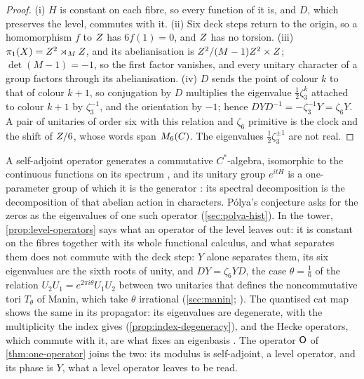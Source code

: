 \begin{proof}
(i) $H$ is constant on each fibre, so every function of it is, and $D$, which preserves the level, commutes with it.
(ii) Six deck steps return to the origin, so a homomorphism $f$ to $Z$ has $6f(1)=0$, and $Z$ has no torsion.
(iii) $\pi_1(X)=Z^2\rtimes_MZ$, and its abelianisation is $Z^2/(M-1)Z^2\times Z$; $\det(M-1)=-1$, so the first
factor vanishes, and every unitary character of a group factors through its abelianisation.
(iv) $D$ sends the point of colour $k$ to that of colour $k+1$, so conjugation by $D$ multiplies the eigenvalue
$\tfrac12\zeta_3^{k}$ attached to colour $k+1$ by $\zeta_3^{-1}$, and the orientation by $-1$; hence
$DYD^{-1}=-\zeta_3^{-1}Y=\zeta_6Y$.  A pair of unitaries of order six with this relation and $\zeta_6$ primitive is
the clock and the shift of $Z/6$, whose words span $M_6(C)$.  The eigenvalues $\tfrac12\zeta_3^{\pm1}$ are not
real.
\end{proof}

\begin{remark}\label{rmk:one-operator}
A self-adjoint operator generates a commutative $C^*$-algebra, isomorphic to the continuous functions on its
spectrum \cite{gelfandnaimark43}, and its unitary group $e^{itH}$ is a one-parameter group of which it is the
generator \cite{stone32}: its spectral decomposition is the decomposition of that abelian action in characters.
P\'olya's conjecture asks for the zeros as the eigenvalues of one such operator (\cref{sec:polya-hist}).  In the
tower, \cref{prop:level-operators} says what an operator of the level leaves out: it is constant on the fibres
together with its whole functional calculus, and what separates them does not commute with the
deck step: $Y$ alone separates them, its six eigenvalues are the sixth roots of unity, and $DY=\zeta_6YD$, the case $\theta=\tfrac16$ of the relation $U_2U_1=e^{2\pi i\theta}U_1U_2$ between two unitaries that defines the
noncommutative tori $T_\theta$ of Manin, which take $\theta$ irrational (\cref{sec:manin}; \cite{manin04}).  The
quantised cat map shows the same in its propagator: its eigenvalues are degenerate, with the multiplicity the index
gives (\cref{prop:index-degeneracy}), and the Hecke operators, which commute with it, are what fixes an eigenbasis
\cite{kurlbergrudnick00}.  The operator $\mathsf{O}$ of \cref{thm:one-operator} joins the two: its modulus is self-adjoint, a
level operator, and its phase is $Y$, what a level operator leaves to be read.
\end{remark}


